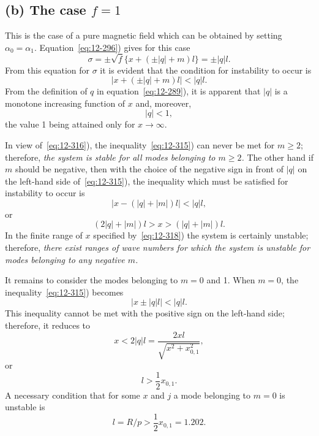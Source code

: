 \subsection*{(b) The case $f = 1$}

This is the case of a pure magnetic field which can be obtained by setting $\alpha_0 = \alpha_1$. Equation~\eqref{eq:12-296}) gives for this case
\begin{equation}
\label{eq:12-314}
\sigma = \pm\sqrt{f}\{x + (\pm|q|+m)l\} = \pm|q|l.
\end{equation}
From this equation for $\sigma$ it is evident that the condition for instability to occur is
\begin{equation}
\label{eq:12-315}
|x + (\pm|q|+m)l| < |q|l.
\end{equation}
From the definition of $q$ in equation~\eqref{eq:12-289}), it is apparent that $|q|$ is a monotone increasing function of $x$ and, moreover,
\begin{equation}
\label{eq:12-316}
|q| < 1,
\end{equation}
the value 1 being attained only for $x \to \infty$.

In view of~\eqref{eq:12-316}), the inequality~\eqref{eq:12-315}) can never be met for $m \geq 2$; therefore, \emph{the system is stable for all modes belonging to $m \geq 2$.} The other hand if $m$ should be negative, then with the choice of the negative sign in front of $|q|$ on the left-hand side of~\eqref{eq:12-315}), the inequality which must be satisfied for instability to occur is
\begin{equation}
\label{eq:12-317}
|x - (|q|+|m|)l| < |q|l,
\end{equation}
or
\begin{equation}
\label{eq:12-318}
(2|q|+|m|)l > x > (|q|+|m|)l.
\end{equation}
In the finite range of $x$ specified by~\eqref{eq:12-318}) the system is certainly unstable; therefore, \emph{there exist ranges of wave numbers for which the system is unstable for modes belonging to any negative $m$.}

It remains to consider the modes belonging to $m = 0$ and 1. When $m = 0$, the inequality~\eqref{eq:12-315}) becomes
\begin{equation}
\label{eq:12-319}
|x \pm |q|l| < |q|l.
\end{equation}
This inequality cannot be met with the positive sign on the left-hand side; therefore, it reduces to
\begin{equation}
\label{eq:12-320}
x < 2|q|l = \frac{2xl}{\sqrt{x^2+x^2_{0,1}}},
\end{equation}
or
\begin{equation}
\label{eq:12-321}
l > \frac{1}{2}x_{0,1}.
\end{equation}
A necessary condition that for some $x$ and $j$ a mode belonging to $m = 0$ is unstable is
\begin{equation}
\label{eq:12-322}
l = R/p > \frac{1}{2}x_{0,1} = 1.202.
\end{equation}

